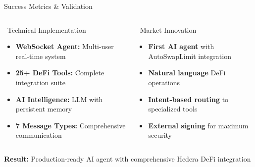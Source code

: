 \documentclass[aspectratio=169]{beamer}
\begin{document}
\begin{frame}{Success Metrics \& Validation}
\begin{columns}
\begin{block}{\faCheckCircle\ Technical Implementation}
\begin{itemize}
\item \textbf{WebSocket Agent:} Multi-user real-time system
\item \textbf{25+ DeFi Tools:} Complete integration suite
\item \textbf{AI Intelligence:} LLM with persistent memory
\item \textbf{7 Message Types:} Comprehensive communication
\end{itemize}
\end{block}

\begin{block}{\faUsers\ Market Innovation}
\begin{itemize}
\item \textbf{First AI agent} with AutoSwapLimit integration
\item \textbf{Natural language} DeFi operations
\item \textbf{Intent-based routing} to specialized tools
\item \textbf{External signing} for maximum security
\end{itemize}
\end{block}
\end{columns}

\vspace{0.05cm}
\begin{center}
\footnotesize \textbf{Result:} Production-ready AI agent with comprehensive Hedera DeFi integration
\end{center}
\end{frame}
\end{document}
